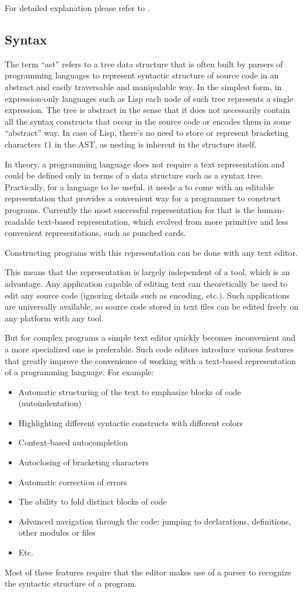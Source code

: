 For detailed explanation please refer to \cite{sicp_meta}.

\subsection{Syntax}
The term ``\acrlong{ast}'' refers to a tree data structure that is often built
by parsers of programming languages to represent syntactic structure of source
code in an abstract and easily traversable and manipulable way. In the simplest
form, in expression-only languages such as Lisp each node of such tree
represents a single expression. The tree is abstract in the sense that it does
not necessarily contain all the syntax constructs that occur in the source code
or encodes them in some ``abstract'' way. In case of Lisp, there's no need to
store or represent bracketing characters \texttt{()} in the AST, as nesting is
inherent in the structure itself.

In theory, a programming language does not require a text representation and
could be defined only in terms of a data structure such as a syntax
tree. Practically, for a language to be useful, it needs a to come with an
editable representation that provides a convenient way for a programmer to
construct programs. Currently the most successful representation for that is the
human-readable text-based representation, which evolved from more primitive and
less convenient representations, such as punched cards.

Constructing programs with this representation can be done with any text editor.

This means that the representation is largely independent of a tool, which is an
advantage. Any application capable of editing text can theoretically be used to
edit any source code (ignoring details such as encoding, etc.). Such
applications are universally available, so source code stored in text files can
be edited freely on any platform with any tool.

But for complex programs a simple text editor quickly becomes inconvenient and a
more specialized one is preferable. Such code editors introduce various features
that greatly improve the convenience of working with a text-based representation
of a programming language. For example:
\begin{itemize}
	\item Automatic structuring of the text to emphasize blocks of code
          (autoindentation)
	\item Highlighting different syntactic constructs with different colors
	\item Context-based autocompletion
	\item Autoclosing of bracketing characters
	\item Automatic correction of errors
	\item The ability to fold distinct blocks of code
	\item Advanced navigation through the code: jumping to declarations,
          definitions, other modules or files
	\item Etc.
\end{itemize}
Most of these features require that the editor makes use of a parser to
recognize the syntactic structure of a program.

